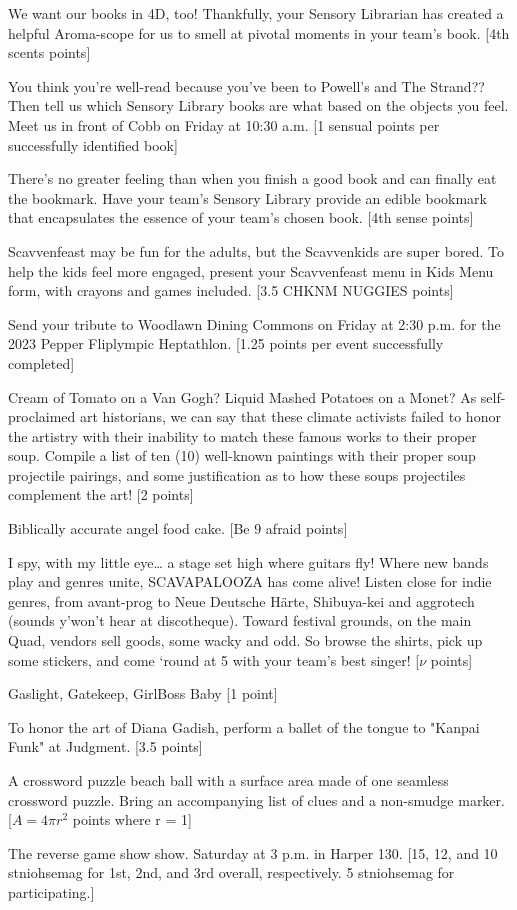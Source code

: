 \documentclass{book}
\begin{document}
\begin{list}{}{}
\newpage
\item We want our books in 4D, too! Thankfully, your Sensory Librarian has created a helpful Aroma-scope for us to smell at pivotal moments in your team's book. [4th scents points]
\item You think you're well-read because you've been to Powell’s and The Strand?? Then tell us which Sensory Library books are what based on the objects you feel. Meet us in front of Cobb on Friday at 10:30 a.m. [1 sensual points per successfully identified book]
\item There’s no greater feeling than when you finish a good book and can finally eat the bookmark. Have your team’s Sensory Library provide an edible bookmark that encapsulates the essence of your team’s chosen book. [4th sense points]
\item Scavvenfeast may be fun for the adults, but the Scavvenkids are super bored. To help the kids feel more engaged, present your Scavvenfeast menu in Kids Menu form, with crayons and games included. [3.5 CHKNM NUGGIES points]
\item Send your tribute to Woodlawn Dining Commons on Friday at 2:30 p.m. for the 2023 Pepper Fliplympic Heptathlon. [1.25 points per event successfully completed]
\item Cream of Tomato on a Van Gogh? Liquid Mashed Potatoes on a Monet? As self-proclaimed art historians, we can say that these climate activists failed to honor the artistry with their inability to match these famous works to their proper soup. Compile a list of ten (10) well-known paintings with their proper soup projectile pairings, and some justification as to how these soups projectiles complement the art! [2 points]
\item Biblically accurate angel food cake. [Be 9 afraid points]
\item I spy, with my little eye… a stage set high where guitars fly! Where new bands play and genres unite, SCAVAPALOOZA has come alive! Listen close for indie genres, from avant-prog to Neue Deutsche Härte, Shibuya-kei and aggrotech (sounds y'won’t hear at discotheque). Toward festival grounds, on the main Quad, vendors sell goods, some wacky and odd. So browse the shirts, pick up some stickers, and come ‘round at 5 with your team’s best singer! [$\nu$ points]
\item Gaslight, Gatekeep, GirlBoss Baby [1 point]
\item To honor the art of Diana Gadish, perform a ballet of the tongue to "Kanpai Funk" at Judgment. [3.5 points]
\item A crossword puzzle beach ball with a surface area made of one seamless crossword puzzle. Bring an accompanying list of clues and a non-smudge marker. [$A=4πr^2$ points where r = 1]
\item The reverse game show show. Saturday at 3 p.m. in Harper 130. [15, 12, and 10 stniohsemag for 1st, 2nd, and 3rd overall, respectively. 5 stniohsemag for participating.]


\end{list}
\end{document}
